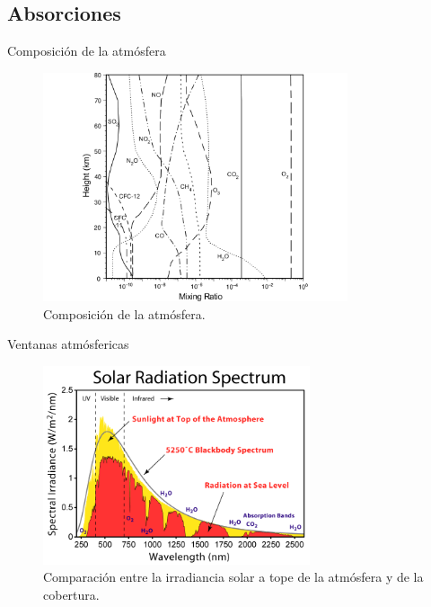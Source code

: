 \documentclass[handout]{beamer}
\begin{document}
\subsection{Absorciones}

\begin{frame}{Composición de la atmósfera}
  \begin{figure}
  \centering
  \includegraphics[width=0.8\textwidth]{imagenes/composicion.png}
  \caption{Composición de la atmósfera.}
  \end{figure}
\end{frame}

\begin{frame}{Ventanas atmósfericas}
  \begin{figure}
  \centering
  \includegraphics[width=0.7\textwidth]{imagenes/solar_spectrum.png}
    \caption{Comparación entre la irradiancia solar a tope de la atmósfera y de la cobertura.}
  \end{figure}
\end{frame}
\end{document}
